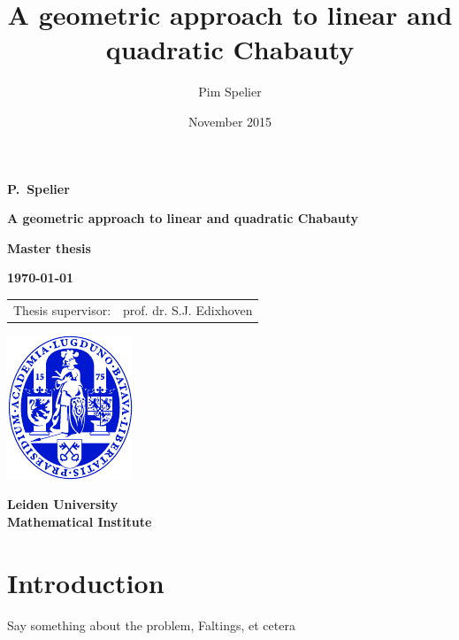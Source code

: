 \documentclass{article}
\title{A geometric approach to linear and quadratic Chabauty}
\author{Pim Spelier}
\date{November 2015}
\theoremstyle{plain}
\theoremstyle{definition}
\theoremstyle{remark}
\begin{document}

\vspace*{1em}

\begin{center}

{\Large\bf 
P.\ Spelier
} 

\vspace{1em} 

{\LARGE\bf 
A geometric approach to linear and quadratic Chabauty
} 

\vspace{10em} 

{\large\bf 
Master thesis
} 

\vspace{1em}

{\large\bf 
\today
}

\vspace{10em} 

{\large\bf
\begin{tabular}{ll}
Thesis supervisor: & prof. dr. S.J. Edixhoven\\
\end{tabular}
}

\vfill

\includegraphics{ulzegel_blauw}\\

\vspace{2em}

{\large\bf 
Leiden University\\
Mathematical Institute\\
}

\end{center}
\thispagestyle{empty}
\newpage

\tableofcontents
\newpage


\section{Introduction}
\label{section:intro}
Say something about the problem, Faltings, et cetera
\end{document}
